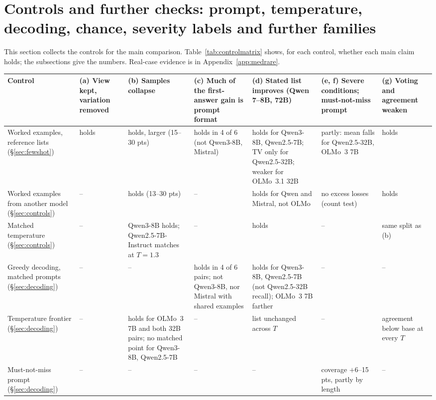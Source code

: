 \documentclass[wcp]{jmlr}
\begin{document}
\begin{table}[t]
\label{tab:reversal}
\end{table}

\section{Controls and further checks: prompt, temperature, decoding, chance, severity labels and further families}\label{app:controls}
This section collects the controls for the main comparison. Table~\ref{tab:controlmatrix} shows, for each control, whether each main claim holds; the subsections give the numbers. Real-case evidence is in Appendix~\ref{app:medrare}.

\begin{table}[p]
\centering\tiny
\setlength{\tabcolsep}{2.5pt}
\renewcommand{\arraystretch}{1.05}
\begin{tabular}{L{2.2cm}L{1.7cm}L{2.0cm}L{1.8cm}L{2.0cm}L{2.3cm}L{1.9cm}}
\toprule
Control & (a) View kept, variation removed & (b) Samples collapse & (c) Much of the first-answer gain is prompt format & (d) Stated list improves (Qwen 7--8B, 72B) & (e, f) Severe conditions; must-not-miss prompt & (g) Voting and agreement weaken \\
\midrule
Worked examples, reference lists (\S\ref{sec:fewshot}) & holds & holds, larger (15--30 pts) & holds in 4 of 6 (not Qwen3-8B, Mistral) & holds for Qwen3-8B, Qwen2.5-7B; TV only for Qwen2.5-32B; weaker for OLMo~3.1 32B & partly: mean falls for Qwen2.5-32B, OLMo~3 7B & holds \\
Worked examples from another model (\S\ref{sec:controls}) & -- & holds (13--30 pts) & -- & holds for Qwen and Mistral, not OLMo & no excess losses (count test) & holds \\
Matched temperature (\S\ref{sec:controls}) & -- & Qwen3-8B holds; Qwen2.5-7B-Instruct matches at $T{=}1.3$ & -- & holds & -- & same split as (b) \\
Greedy decoding, matched prompts (\S\ref{sec:decoding}) & -- & -- & holds in 4 of 6 pairs; not Qwen3-8B, nor Mistral with shared examples & holds for Qwen3-8B, Qwen2.5-7B (not Qwen2.5-32B recall); OLMo~3 7B farther & -- & -- \\
Temperature frontier (\S\ref{sec:decoding}) & -- & holds for OLMo~3 7B and both 32B pairs; no matched point for Qwen3-8B, Qwen2.5-7B & -- & list unchanged across $T$ & -- & agreement below base at every $T$ \\
Must-not-miss prompt (\S\ref{sec:decoding}) & -- & -- & -- & -- & coverage $+6$--15 pts, partly by length & -- \\

\end{tabular}
\end{table}
\end{document}
